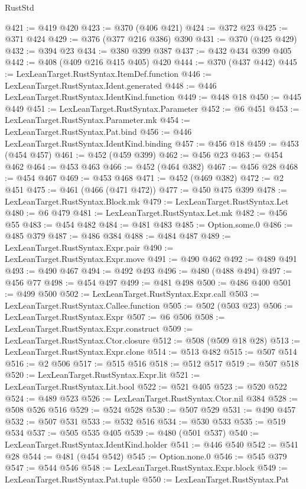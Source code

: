 \begin{lexlean}{RustStd}
\begin{coremodule}
@421 := @419 @420
@423 := @370 (@406 @421)
@424 := @372 @23
@425 := @371 @424
@429 := @376 (@377 @216 @386) @390
@431 := @370 (@425 @429)
@432 := @394 @23
@434 := @380 @399 @387
@437 := @432 @434 @399 @405
@442 := @408 (@409 @216 @415 @405) @420
@444 := @370 (@437 @442)
@445 := LexLeanTarget.RustSyntax.ItemDef.function
@446 := LexLeanTarget.RustSyntax.Ident.generated
@448 := @446 LexLeanTarget.RustSyntax.IdentKind.function
@449 := @448 @18
@450 := @445 @449
@451 := LexLeanTarget.RustSyntax.Parameter
@452 := @6 @451
@453 := LexLeanTarget.RustSyntax.Parameter.mk
@454 := LexLeanTarget.RustSyntax.Pat.bind
@456 := @446 LexLeanTarget.RustSyntax.IdentKind.binding
@457 := @456 @18
@459 := @453 (@454 @457)
@461 := @452 (@459 @399)
@462 := @456 @23
@463 := @454 @462
@464 := @453 @463
@466 := @452 (@464 @382)
@467 := @456 @28
@468 := @454 @467
@469 := @453 @468
@471 := @452 (@469 @382)
@472 := @2 @451
@475 := @461 (@466 (@471 @472))
@477 := @450 @475 @399
@478 := LexLeanTarget.RustSyntax.Block.mk
@479 := LexLeanTarget.RustSyntax.Let
@480 := @6 @479
@481 := LexLeanTarget.RustSyntax.Let.mk
@482 := @456 @55
@483 := @454 @482
@484 := @481 @483
@485 := Option.some.{0}
@486 := @485 @379
@487 := @486 @384
@488 := @484 @487
@489 := LexLeanTarget.RustSyntax.Expr.pair
@490 := LexLeanTarget.RustSyntax.Expr.move
@491 := @490 @462
@492 := @489 @491
@493 := @490 @467
@494 := @492 @493
@496 := @480 (@488 @494)
@497 := @456 @77
@498 := @454 @497
@499 := @481 @498
@500 := @486 @400
@501 := @499 @500
@502 := LexLeanTarget.RustSyntax.Expr.call
@503 := LexLeanTarget.RustSyntax.Callee.function
@505 := @502 (@503 @23)
@506 := LexLeanTarget.RustSyntax.Expr
@507 := @6 @506
@508 := LexLeanTarget.RustSyntax.Expr.construct
@509 := LexLeanTarget.RustSyntax.Ctor.closure
@512 := @508 (@509 @18 @28)
@513 := LexLeanTarget.RustSyntax.Expr.clone
@514 := @513 @482
@515 := @507 @514
@516 := @2 @506
@517 := @515 @516
@518 := @512 @517
@519 := @507 @518
@520 := LexLeanTarget.RustSyntax.Expr.lit
@521 := LexLeanTarget.RustSyntax.Lit.bool
@522 := @521 @405
@523 := @520 @522
@524 := @489 @523
@526 := LexLeanTarget.RustSyntax.Ctor.nil @384
@528 := @508 @526 @516
@529 := @524 @528
@530 := @507 @529
@531 := @490 @457
@532 := @507 @531
@533 := @532 @516
@534 := @530 @533
@535 := @519 @534
@537 := @505 @535 @405
@539 := @480 (@501 @537)
@540 := LexLeanTarget.RustSyntax.IdentKind.holder
@541 := @446 @540
@542 := @541 @28
@544 := @481 (@454 @542)
@545 := Option.none.{0}
@546 := @545 @379
@547 := @544 @546
@548 := LexLeanTarget.RustSyntax.Expr.block
@549 := LexLeanTarget.RustSyntax.Pat.tuple
@550 := LexLeanTarget.RustSyntax.Pat

\end{coremodule}
\end{lexlean}

